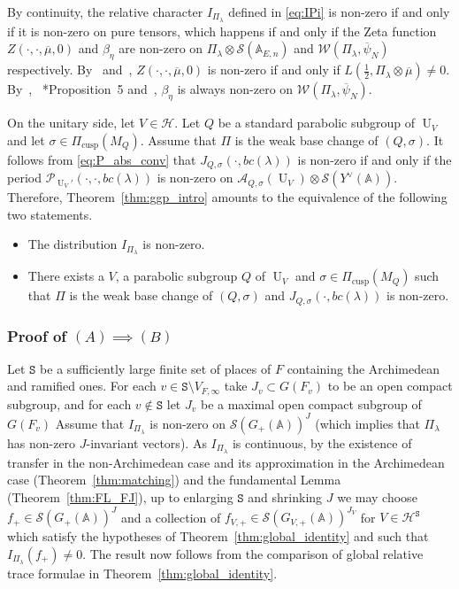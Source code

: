 \documentclass[letterpaper,11pt]{amsart}
\newcommand{\bA}{\mathbb{A}}
\newcommand{\cA}{\mathcal{A}}
\newcommand{\cH}{\mathcal{H}}
\newcommand{\cP}{\mathcal{P}}
\newcommand{\cS}{\mathcal{S}}
\newcommand{\cW}{\mathcal{W}}
\newcommand{\tS}{\mathtt{S}}
\newcommand{\<}{\negthickspace}
\DeclareMathOperator{\U}{U}
\DeclareMathOperator{\cusp}{cusp}
\theoremstyle{definition}
\theoremstyle{plain}
\theoremstyle{remark}
\numberwithin{equation}{section}
\begin{document}
By continuity, the relative character $I_{\Pi_\lambda}$ defined in \eqref{eq:IPi} is non-zero if and only if it is non-zero on pure tensors, which happens if and only if the Zeta function $Z(\cdot, \cdot, \overline{\mu}, 0)$ and $\beta_\eta$ are non-zero on $\Pi_\lambda \otimes \cS(\bA_{E,n})$ and $\cW(\Pi_\lambda,\overline{\psi}_N)$ respectively. By~\cite{JPSS83} and~\cite{Jac04}, $Z(\cdot, \cdot, \overline{\mu}, 0)$ is non-zero if and only if $L(\frac{1}{2},\Pi_\lambda \otimes \overline{\mu}) \neq 0$. By~\cite{GK75}, ~\cite{Jac10}*{Proposition~5} and~\cite{Kem15}, $\beta_\eta$ is always non-zero on $\cW(\Pi_\lambda,\overline{\psi}_N)$.

On the unitary side, let $V \in \cH$. Let $Q$ be a standard parabolic subgroup of $\U_V$ and let $\sigma \in \Pi_{\cusp}(M_Q)$. Assume that $\Pi$ is the weak base change of $(Q,\sigma)$. It follows from \eqref{eq:P_abs_conv} that $J_{Q,\sigma}(\cdot,bc(\lambda))$ is non-zero if and only if the period $\cP_{\U_V'}(\cdot,\cdot,bc(\lambda))$ is non-zero on $\cA_{Q,\sigma}(\U_V) \otimes \cS(Y^\vee(\bA))$. Therefore, Theorem~\ref{thm:ggp_intro} amounts to the equivalence of the following two statements.
\begin{itemize}
    \item[(A)] The distribution $I_{\Pi_\lambda}$ is non-zero.
    \item[(B)] There exists a $V$, a parabolic subgroup $Q$ of $\U_V$ and $\sigma \in \Pi_{\cusp}(M_Q)$ such that $\Pi$ is the weak base change of $(Q,\sigma)$ and $J_{Q,\sigma}(\cdot,bc(\lambda))$ is non-zero.
\end{itemize}

\subsubsection{Proof of $(A)\implies (B)$}
Let $\tS$ be a sufficiently large finite set of places of $F$ containing the Archimedean and ramified ones. For each $v \in \tS \setminus V_{F,\infty}$ take $J_v \subset G(F_v)$ to be an open compact subgroup, and for each $v \notin \tS$ let $J_v$ be a maximal open compact subgroup of $G(F_v)$ Assume that $I_{\Pi_\lambda}$ is non-zero on $\cS(G_+(\bA))^J$ (which implies that $\Pi_\lambda$ has non-zero $J$-invariant vectors). As $I_{\Pi_\lambda}$ is continuous, by the existence of transfer in the non-Archimedean case and its approximation in the Archimedean case (Theorem~\ref{thm:matching}) and the fundamental Lemma (Theorem~\ref{thm:FL_FJ}), up to enlarging $\tS$ and shrinking $J$ we may choose $f_+ \in \cS(G_+(\bA))^J$ and a collection of $f_{V,+} \in \cS(G_{V,+}(\bA))^{J_{V}}$ for $V \in \cH^\tS$ which satisfy the hypotheses of Theorem~\ref{thm:global_identity} and such that $I_{\Pi_\lambda}(f_+) \neq 0$. The result now follows from the comparison of global relative trace formulae in Theorem~\ref{thm:global_identity}.
\end{document}
